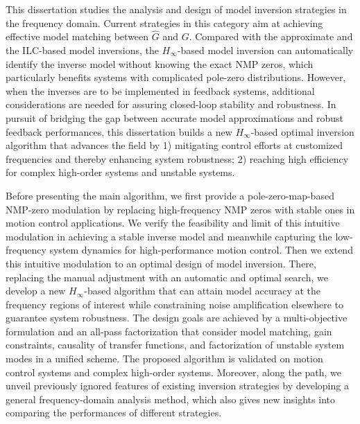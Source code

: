 \documentclass [11pt, proquest] {uwthesis}[2020/02/24]
\begin{document}
This dissertation studies the analysis and design of model inversion strategies
in the frequency domain. Current strategies in this category aim at
achieving effective model matching between $\hat{G}$ and $G$. Compared
with the approximate and the ILC-based model inversions, the $H_{\infty}$-based
model inversion can automatically identify the inverse model without
knowing the exact NMP zeros, which particularly benefits systems with
complicated pole-zero distributions. However, when the inverses are
to be implemented in feedback systems, additional considerations are
needed for assuring closed-loop stability and robustness. In pursuit
of bridging the gap between accurate model approximations and robust
feedback performances, this dissertation builds a new $H_{\infty}$-based
optimal inversion algorithm that advances the field by 1) mitigating
control efforts at customized frequencies and thereby enhancing system
robustness; 2) reaching high efficiency for complex high-order systems
and unstable systems.

Before presenting the main algorithm, we first provide a pole-zero-map-based
NMP-zero modulation by replacing high-frequency NMP zeros with stable
ones in motion control applications. We verify the feasibility and
limit of this intuitive modulation in achieving a stable inverse model
and meanwhile capturing the low-frequency system dynamics for high-performance
motion control. Then we extend this intuitive modulation to an optimal
design of model inversion. There, replacing the manual adjustment
with an automatic and optimal search, we develop a new $H_{\infty}$-based
algorithm that can attain model accuracy at the frequency regions
of interest while constraining noise amplification elsewhere to guarantee
system robustness. The design goals are achieved by a multi-objective
formulation and an all-pass factorization that consider model matching,
gain constraints, causality of transfer functions, and factorization
of unstable system modes in a unified scheme. The proposed algorithm
is validated on motion control systems and complex high-order systems.
Moreover, along the path, we unveil previously ignored features of
existing inversion strategies by developing a general frequency-domain
analysis method, which also gives new insights into comparing the
performances of different strategies.
\end{document}

